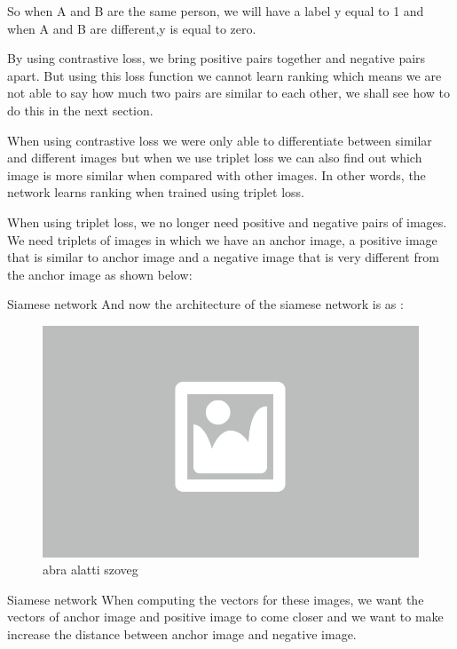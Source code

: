 
So when A and B are the same person, we will have a label y equal to 1 and when A and B are different,y is equal to zero.

By using contrastive loss, we bring positive pairs together and negative pairs apart. But using this loss function we cannot learn ranking which means we are not able to say how much two pairs are similar to each other, we shall see how to do this in the next section.


When using contrastive loss we were only able to differentiate between similar
and different images but when we use triplet loss we can also find out which
image is more similar when compared with other images. In other words, the
network learns ranking when trained using triplet loss.

When using triplet loss, we no longer need positive and negative pairs of
images. We need triplets of images in which we have an anchor image, a positive
image that is similar to anchor image and a negative image that is very
different from the anchor image as shown below:

Siamese network And now the architecture of the siamese network is as :

\begin{figure}[ht]
	\centering
	\includegraphics[width=0.65\columnwidth]{figures/abra.png}
	\caption{abra alatti szoveg}
\end{figure}

Siamese network When computing the vectors for these images, we want the
vectors of anchor image and positive image to come closer and we want to make
increase the distance between anchor image and negative image.

